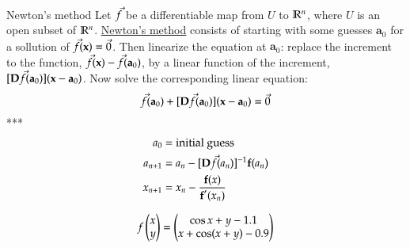 
\begin{defn}{Newton's method}
Let $\textbf{\ensuremath{\Vec{f}}}$ be a differentiable map from $U$ to $\mathbb{R}^n$, where $U$ is an open subset of $\mathbb{R}^n$. \ul{Newton's method} consists of starting with some guesses $\bm{a}_0$ for a sollution of $\textbf{\ensuremath{\Vec{f}}}(\textbf{x})=\Vec{0}$. Then linearize the equation at $\bm{a}_0$: replace the increment to the function, $\textbf{\ensuremath{\Vec{f}}}(\textbf{x})-\textbf{\ensuremath{\Vec{f}}}(\textbf{a}_0)$, by a linear function of the increment, $[\textbf{D\ensuremath{\Vec{f}}}(\textbf{a}_0)](\textbf{x}-\textbf{a}_0)$. Now solve the corresponding linear equation:
  \[\Vec{f}(\textbf{a}_0)+[\textbf{D\ensuremath{\Vec{f}}}(\textbf{a}_0)](\textbf{x}-\textbf{a}_0)=\Vec{0}\]
  ***
  \begin{align*}
    a_0 &= \text{initial guess} \\
    a_{n+1} &= a_n - [\textbf{D\ensuremath{\Vec{f}}}(a_n)]^{-1} \textbf{f}(a_n) \\
    x_{n+1} &= x_n - \frac{\textbf{f}(x)}{\textbf{f}'(x_n)}
  \end{align*}
\end{defn}

\example
\[f\begin{pmatrix} x \\ y \end{pmatrix} = \begin{pmatrix} \cos x + y - 1.1 \\  x + \cos (x + y) - 0.9 \end{pmatrix}\]

